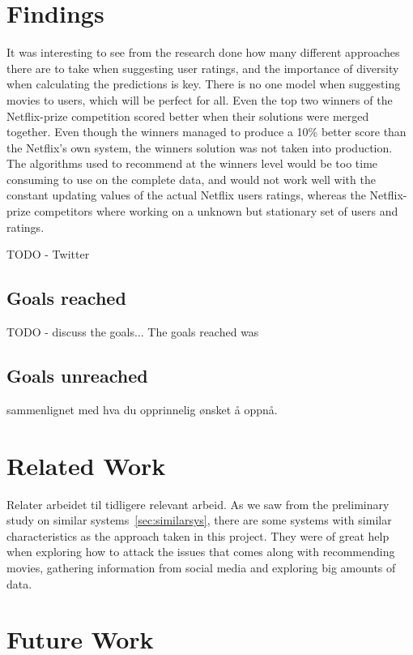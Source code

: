 \section{Findings}
It was interesting to see from the research done how many different approaches there are to take when suggesting user ratings, and the importance of diversity when calculating the predictions is key. There is no one model when suggesting movies to users, which will be perfect for all. Even the top two winners of the Netflix-prize competition scored better when their solutions were merged together. Even though the winners managed to produce a 10\% better score than the Netflix's own system, the winners solution was not taken into production. The algorithms used to recommend at the winners level would be too time consuming to use on the complete data, and would not work well with the constant updating values of the actual Netflix users ratings, whereas the Netflix-prize competitors where working on a unknown but stationary set of users and ratings.

TODO - Twitter

\subsection{Goals reached}
TODO - discuss the goals...
The goals reached was

\subsection{Goals unreached}
sammenlignet med hva du opprinnelig ønsket å oppnå.


\section{Related Work}
Relater arbeidet til tidligere relevant arbeid.
As we saw from the preliminary study on similar systems~\ref{sec:similarsys}, there are some systems with similar characteristics as the approach taken in this project. They were of great help when exploring how to attack the issues that comes along with recommending movies, gathering information from social media and exploring big amounts of data.


\section{Future Work}
